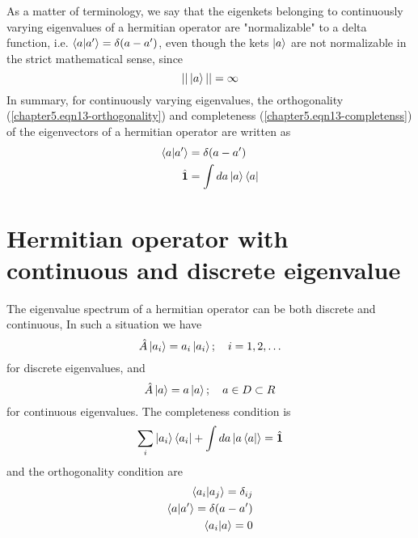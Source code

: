 		As a matter of terminology, we say that the eigenkets belonging to continuously varying eigenvalues of a hermitian operator are "normalizable" to a delta function, i.e. $\braket{a}{a^\prime} = \delta(a-a^\prime)$, even though the kets $\ket{a}$ are not normalizable in the strict mathematical sense, since
		\begin{equation}
			|| \ket{a} || = \infty
		\end{equation}
		In summary, for continuously varying eigenvalues, the orthogonality (\ref{chapter5.eqn13-orthogonality}) and completeness (\ref{chapter5.eqn13-completenss}) of the eigenvectors of a hermitian operator are written as
		\begin{eqnarray}
			\braket{a}{a^\prime} &= \delta(a-a^\prime)  \label{chapter5.eqn13-orthogonality}\\
			\hat{\mathbf{1}} &= \int da  \ket{a}\bra{a}  \label{chapter5.eqn13-completenss}
		\end{eqnarray}
		
		
	\section{Hermitian operator with continuous and discrete eigenvalue}
	The eigenvalue spectrum of a hermitian operator can be both discrete and continuous, In such a situation we have
	\begin{equation}
		\hat{A} \ket{a_i} = a_i \ket{a_i} ; \quad i=1,2,\ldots
	\end{equation}
	for discrete eigenvalues, and
	\begin{equation}
		\hat{A}\ket{a} = a\ket{a};\quad a\in D \subset R
	\end{equation}
	for continuous eigenvalues. The completeness condition is
	\begin{equation}
		\sum_i \ket{a_i}\bra{a_i} + \int da \ket{a\bra{a}} = \hat{\mathbf{1}}
	\end{equation}
	and the orthogonality condition are
	\begin{eqnarray}
		\braket{a_i}{a_j} = \delta_{ij} \\
		\braket{a}{a^\prime} =\delta(a-a^\prime)\\
		\braket{a_i}{a} = 0
	\end{eqnarray}
	
